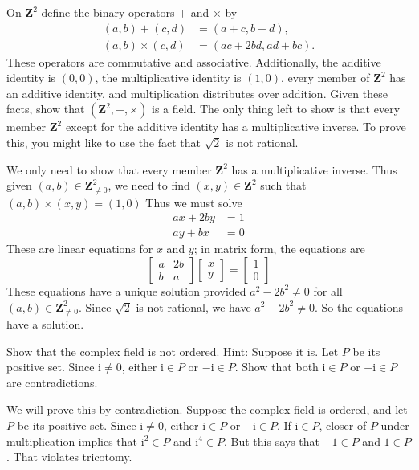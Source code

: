 \documentclass[12pt,fleqn,answers]{exam}
\newcommand{\integers}{\mathbf{Z}}
\begin{document}
\begin{questions}
 \question[5] On $\integers^2$ define the binary operators
 $+$ and $\times$ by
\begin{align*}
  (a,b) + (c,d) &= (a+c,b+d),\\
  (a,b) \times (c,d) &= (ac+2bd, ad+bc).
\end{align*}
These operators are commutative and associative. Additionally, the
additive identity is $(0,0)$, the multiplicative identity is
$(1,0)$, every member of $\integers^2$ has an additive identity, and multiplication distributes over addition.
Given these facts, show that $(\integers^2, +, \times)$ is a 
field. The only thing left to show is that every member 
$\integers^2$ except for the additive identity has a multiplicative
inverse. To prove this, you might like to use the fact that $\sqrt{2}$ is
not rational.
\begin{solution}  We only need to show that every member \(\integers^2\)
  has a multiplicative inverse.  Thus given $(a,b) \in \integers_{\neq 0}^2$, we
  need to find $(x,y) \in \integers^2$ such that $(a,b) \times (x,y) = (1,0)$
  Thus we must solve
  \begin{align*}
    ax+2by &= 1 \\
    ay+bx  &= 0
  \end{align*}
  These are linear equations for $x$ and $y$; in matrix form, the equations
  are
  \[
    \begin{bmatrix} a & 2 b \\ b & a \end{bmatrix}
    \begin{bmatrix} x \\ y \end{bmatrix}
    = \begin{bmatrix} 1  \\ 0 \end{bmatrix}
  \]
  These equations have a unique solution provided $a^2 - 2 b^2 \neq 0$
  for all $(a,b) \in \integers_{\neq 0} ^2$. Since $\sqrt{2}$ is not
  rational, we have $a^2 - 2 b^2 \neq 0$. So the equations have 
  a solution.
\end{solution}

\question[5] Show that the complex field is not ordered. Hint: Suppose 
it is. Let $P$ be its positive set. Since $\mathrm{i} \neq 0$, either
$\mathrm{i} \in P$ or $-\mathrm{i} \in P$. Show that both 
$\mathrm{i} \in P$ or $-\mathrm{i} \in P$ are 
contradictions.
\begin{solution}  
  \begin{solution}  
    We will prove this by contradiction. Suppose the complex field
    is ordered, and let $P$ be its positive set. Since $\mathrm{i}  \neq 0$,
    either $\mathrm{i} \in P$ or $-\mathrm{i} \in P$. If
    $\mathrm{i} \in P$, closer of $P$ under multiplication implies
    that $\mathrm{i}^2 \in P$ and   $\mathrm{i}^4 \in P$. But this
    says that $-1 \in P$ and $1 \in P$. That violates tricotomy.
    

\end{solution}
\end{solution}
\end{questions}
\end{document}

